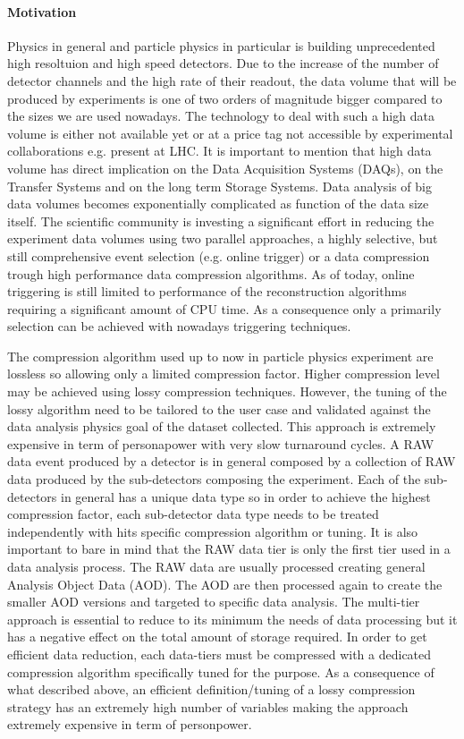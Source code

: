 \paragraph{Motivation}

Physics in general and particle physics in particular is building unprecedented high resoltuion and high speed detectors. 
Due to the increase of the number of detector channels and the high rate of their readout, the data volume that will be produced by experiments is one of two orders of magnitude bigger compared to the sizes we are used nowadays. The technology to deal with such a high data volume is either not available yet or at a price tag not accessible by experimental collaborations e.g. present at LHC. It is important to mention that high data volume has direct implication on the Data Acquisition Systems (DAQs), on the Transfer Systems and on the long term Storage Systems. Data analysis of big data volumes becomes exponentially complicated as function of the data size itself. The scientific community is investing a significant effort in reducing the experiment data volumes using two parallel approaches, a highly selective, but still comprehensive event selection (e.g. online trigger) or a data compression trough high performance data compression algorithms. 
As of today, online triggering is still limited to performance of the reconstruction algorithms requiring a significant amount of CPU time. As a consequence only a primarily selection can be achieved with nowadays triggering techniques. 

The compression algorithm used up to now in particle physics experiment are lossless so allowing only a limited compression factor. Higher compression level may be achieved using lossy compression techniques. However, the tuning of the lossy algorithm need to be tailored to the user case and validated against the data analysis physics goal of the dataset collected. This approach is extremely expensive in term of personapower with very slow turnaround cycles. A RAW data event produced by a detector is in general composed by a collection of RAW data produced by the sub-detectors composing the experiment. Each of the sub-detectors in general has a unique data type so in order to achieve the highest compression factor, each sub-detector data type needs to be treated independently with hits specific compression algorithm or tuning. It is also important to bare in mind that the RAW data tier is only the first tier used in a data analysis process. The RAW data are usually processed creating general Analysis Object Data (AOD). The AOD are then processed again to create the smaller AOD versions and targeted to specific data analysis. The multi-tier approach is essential to reduce to its minimum the needs of data processing but it has a negative effect on the total amount of storage required. In order to get efficient data reduction, each data-tiers must be compressed with a dedicated compression algorithm specifically tuned for the purpose.  As a consequence of what described above, an efficient definition/tuning of a lossy compression strategy has an extremely high number of variables making the approach extremely expensive in term of personpower.


